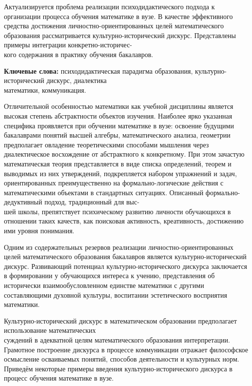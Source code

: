 \vzmscaption




Актуализируется проблема реализации психодидактического подхода к организации процесса обучения математике в вузе. В качестве эффективного средства достижения личностно-ориентированных целей математического образования рассматривается культурно-исторический дискурс. Представлены примеры интеграции конкретно-историчес-\\кого содержания в практику обучения бакалавров.




{\bf Ключевые слова:} психодидактическая парадигма образования, культурно-исторический дискурс, диалектика \\математики, коммуника\-ция.


Отличительной особенностью математики как учебной дисциплины является высокая степень абстрактности объектов изучения. Наиболее ярко указанная специфика проявляется при обучении математике в вузе: освоение будущими бакалаврами понятий высшей алгебры, математического анализа, геометрии предполагает овладение теоретическими способами мышления через диалектическое восхождение от абстрактного к конкретному. При этом зачастую математическая теория представляется в виде списка определений, теорем и выводимых из них утверждений, подкрепляется набором упражнений и задач, ориентированных преимущественно на формально-логические действия с математическими объектами в стандартных ситуациях. Описанный формально-дедуктивный подход, традиционный для выс-\\шей школы, препятствует психическому развитию личности обучающихся в отношении таких качеств, как поисковая активность, креативность, достижению ими уровня понимания.

Одним из содержательных резервов реализации лично\-стно-ориентированных целей математического образования бакалавров является культурно-исторический дискурс. Развивающий потенциал культурно-исторического дискурса заключается в формировании у обучающихся интереса к учению, представления об исторически взаимообусловленном единстве математики с другими составляющими духовной культуры, воспитании эстетического восприятия математики.

Культурно-исторический дискурс в математическом образовании предполагает использование математических \\суждений в адекватной целям математического образования интерпретации. Грамотное построение дискурса в процессе коммуникации отражает философское осмысление ос\-ваиваемых понятий, способов деятельности и культурных норм. Приведём некоторые примеры введения культурно-исторического дискурса в процесс обучения математике в вузе.

